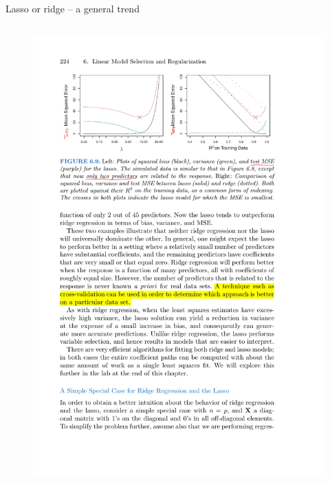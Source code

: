 \documentclass[mathserif, handout, aspectratio=169]{beamer}
\begin{document}
\begin{frame}{Lasso or ridge -- a general trend}
\begin{columns}
\begin{figure}
\includegraphics[scale=1]{lasso-v-ridge-2variables}
\end{figure}
\end{columns}

\end{frame}
\end{document}
